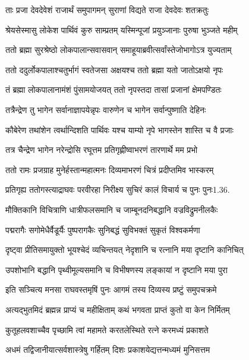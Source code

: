\twolineshloka
{ताः प्रजा देवदेवेशं राजार्थं समुपागमन्}
{सुराणां विद्यते राजा देवदेवः शतक्रतुः}%

\twolineshloka
{श्रेयसेस्मासु लोकेश पार्थिवं कुरु साम्प्रतम्}
{यस्मिन्पूजां प्रयुञ्जानाः पुरुषा भुञ्जते महीम्}%

\twolineshloka
{ततो ब्रह्मा सुरश्रेष्ठो लोकपालान्सवासवान्}
{समाहूयाब्रवीत्सर्वांस्तेजोभागोऽत्र युज्यताम्}%

\twolineshloka
{ततो ददुर्लोकपालाश्चतुर्भागं स्वतेजसा}
{अक्षयश्च ततो ब्रह्मा यतो जातोऽक्षयो नृपः}%

\twolineshloka
{तं ब्रह्मा लोकपालानामंशं पुंसामयोजयत्}
{ततो नृपस्तदा तासां प्रजानां क्षेमपण्डितः}%

\twolineshloka
{तत्रैन्द्रेण तु भागेन सर्वानाज्ञापयेन्नृपः}
{वारुणेन च भागेन सर्वान्पुष्णाति देहिनः}%

\twolineshloka
{कौबेरेण तथांशेन त्वर्थान्दिशति पार्थिवः}
{यश्च याम्यो नृपे भागस्तेन शास्ति च वै प्रजाः}%

\twolineshloka
{तत्र चैन्द्रेण भागेन नरेन्द्रोसि रघूत्तम}
{प्रतिगृह्णीष्वाभरणं तारणार्थे मम प्रभो}%

\twolineshloka
{ततो रामः प्रजग्राह मुनेर्हस्तान्महात्मनः}
{दिव्यमाभरणं चित्रं प्रदीप्तमिव भास्करम्}%

\twolineshloka
{प्रतिगृह्य ततोगस्त्याद्राघवः परवीरहा}
{निरीक्ष्य सुचिरं कालं विचार्य च पुनः पुनः1.36.}%

\twolineshloka
{मौक्तिकानि विचित्राणि धात्रीफलसमानि च}
{जाम्बूनदनिबद्धानि वज्रविद्रुमनीलकैः}%

\twolineshloka
{पद्मरागैः सगोमेधैर्वैडूर्यैः पुष्परागकैः}
{सुनिबद्धं सुविभक्तं सुकृतं विश्वकर्मणा}%

\twolineshloka
{दृष्ट्वा प्रीतिसमायुक्तो भूयश्चेदं व्यचिन्तयत्}
{नेदृशानि च रत्नानि मया दृष्टानि कानिचित्}%

\twolineshloka
{उपशोभानि बद्धानि पृथ्वीमूल्यसमानि च}
{विभीषणस्य लङ्कायां न दृष्टानि मया पुरा}%

\twolineshloka
{इति सञ्चित्य मनसा राघवस्तमृषिं पुनः}
{आगमं तस्य दिव्यस्य प्रष्टुं समुपचक्रमे}%

\twolineshloka
{अत्यद्भुतमिदं ब्रह्मन्न प्राप्यं च महीक्षिताम्}
{कथं भगवता प्राप्तं कुतो वा केन निर्मितम्}%

\twolineshloka
{कुतूहलवशाच्चैव पृच्छामि त्वां महामते}
{करतलेस्थिते रत्ने करमध्यं प्रकाशते}%

\twolineshloka
{अधमं तद्विजानीयात्सर्वशास्त्रेषु गर्हितम्}
{दिशः प्रकाशयेद्यत्तन्मध्यमं मुनिसत्तम}%

